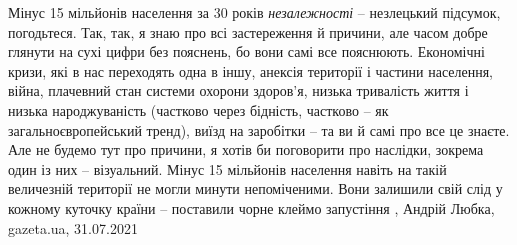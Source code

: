 Мінус 15 мільйонів населення за 30 років \emph{незалежності} – незлецький підсумок,
погодьтеся. Так, так, я знаю про всі застереження й причини, але часом добре
глянути на сухі цифри без пояснень, бо вони самі все пояснюють. Економічні
кризи, які в нас переходять одна в іншу, анексія території і частини населення,
війна, плачевний стан системи охорони здоров'я, низька тривалість життя і
низька народжуваність (частково через бідність, частково – як
загальноєвропейський тренд), виїзд на заробітки – та ви й самі про все це
знаєте.  Але не будемо тут про причини, я хотів би поговорити про наслідки, зокрема один
із них – візуальний. Мінус 15 мільйонів населення навіть на такій величезній
території не могли минути непоміченими. Вони залишили свій слід у кожному
куточку країни – поставили чорне клеймо запустіння
, 
Андрій Любка, gazeta.ua, 31.07.2021
